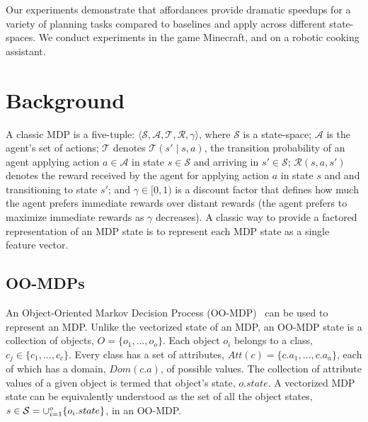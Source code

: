 \documentclass[conference]{IEEEtran}
\begin{document}

Our experiments demonstrate that affordances provide dramatic speedups for a variety
of planning tasks compared to baselines and apply across different state-spaces.  We 
conduct experiments in the game Minecraft, and on a robotic cooking assistant. 

\section{Background}
\label{sec:background}
A classic MDP is a five-tuple: $\langle \mathcal{S}, \mathcal{A}, \mathcal{T},
\mathcal{R}, \gamma \rangle$, where $\mathcal{S}$ is a state-space;
$\mathcal{A}$ is the agent's set of actions; $\mathcal{T}$ denotes
$\mathcal{T}(s' \mid s,a)$, the transition probability of an agent
applying action $a \in \mathcal{A}$ in state $s \in \mathcal{S}$ and
arriving in $s' \in \mathcal{S}$; $\mathcal{R}(s,a,s')$ denotes the
reward received by the agent for applying action $a$ in state $s$ and
and transitioning to state $s'$; and $\gamma \in [0, 1)$ is a discount
factor that defines how much the agent prefers immediate rewards
over distant rewards (the agent prefers to maximize
immediate rewards as $\gamma$ decreases). A classic way to 
provide a factored representation of an MDP state is to represent
each MDP state as a single feature vector. 

\subsection{OO-MDPs}
An Object-Oriented Markov
Decision Process (OO-MDP)~\citep{diuk08} can be used to represent an MDP.
Unlike the vectorized state of an MDP, an OO-MDP state is a collection of objects,
$O = \{o_1, \ldots, o_o \}$.  Each object $o_i$ belongs to a
class, $c_j \in  \{c_1, \ldots, c_c\}$. Every class has a set of attributes,
$Att(c) = \{c.a_1, \ldots, c.a_a \}$, each of which has a domain, $Dom(c.a)$, of 
possible values. The collection of attribute values of a given object is termed 
that object's state, $o.state$. A vectorized MDP state can be equivalently understood as the set
of all the object states, $s \in {\cal S} = \cup_{i = 1}^o \{o_i.state\}$, in an OO-MDP. 
\end{document}
